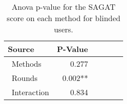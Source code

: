 
\begin{table}[!htb]
\centering
\caption{Anova p-value for the SAGAT score on each method for blinded users.}
\label{tab:blocanova_sagat_avg_two_way_blind}
\begin{tabular}{lrrrrr}
\toprule
          Source & P-Value \\
\midrule
    \    Methods &   0.277 \\
     \    Rounds & 0.002** \\
\    Interaction &   0.834 \\
\bottomrule
\end{tabular}
\end{table}

